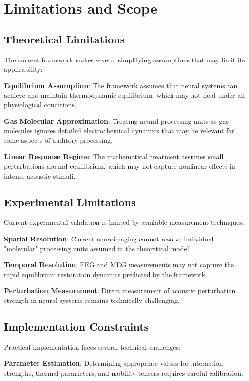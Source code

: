\documentclass[12pt,a4paper]{article}
\begin{document}
\section{Limitations and Scope}

\subsection{Theoretical Limitations}

The current framework makes several simplifying assumptions that may limit its applicability:

\textbf{Equilibrium Assumption}: The framework assumes that neural systems can achieve and maintain thermodynamic equilibrium, which may not hold under all physiological conditions.

\textbf{Gas Molecular Approximation}: Treating neural processing units as gas molecules ignores detailed electrochemical dynamics that may be relevant for some aspects of auditory processing.

\textbf{Linear Response Regime}: The mathematical treatment assumes small perturbations around equilibrium, which may not capture nonlinear effects in intense acoustic stimuli.

\subsection{Experimental Limitations}

Current experimental validation is limited by available measurement techniques:

\textbf{Spatial Resolution}: Current neuroimaging cannot resolve individual "molecular" processing units assumed in the theoretical model.

\textbf{Temporal Resolution}: EEG and MEG measurements may not capture the rapid equilibrium restoration dynamics predicted by the framework.

\textbf{Perturbation Measurement}: Direct measurement of acoustic perturbation strength in neural systems remains technically challenging.

\subsection{Implementation Constraints}

Practical implementation faces several technical challenges:

\textbf{Parameter Estimation}: Determining appropriate values for interaction strengths, thermal parameters, and mobility tensors requires careful calibration.
\end{document}
